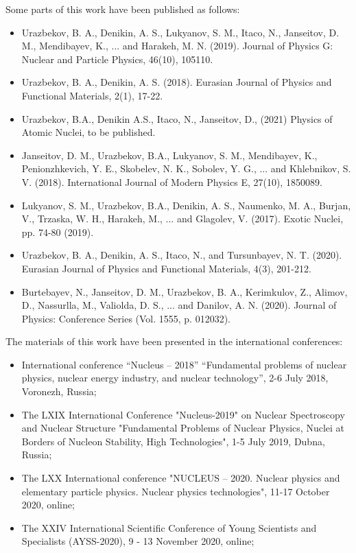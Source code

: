 \documentclass[
12pt, %
oneside, %
english, %
doublespacing, %
doublespacing, %
toctotoc, %
parskip, %
headsepline, %
]{MastersDoctoralThesis} %
\begin{document}
Some parts of this work have been published as follows:
\begin{itemize}
\item	Urazbekov, B. A., Denikin, A. S., Lukyanov, S. M., Itaco, N., Janseitov, D. M., Mendibayev, K., ... and Harakeh, M. N. (2019). Journal of Physics G: Nuclear and Particle Physics, 46(10), 105110.
\item	Urazbekov, B. A.,  Denikin, A. S. (2018).  Eurasian Journal of Physics and Functional Materials, 2(1), 17-22.
\item	Urazbekov, B.A., Denikin A.S., Itaco, N., Janseitov, D., (2021)  Physics of Atomic Nuclei, to be published.
\item	Janseitov, D. M., Urazbekov, B.A., Lukyanov, S. M., Mendibayev, K., Penionzhkevich, Y. E., Skobelev, N. K., Sobolev, Y. G., ... and Khlebnikov, S. V. (2018).  International Journal of Modern Physics E, 27(10), 1850089.
\item	Lukyanov, S. M., Urazbekov, B.A., Denikin, A. S., Naumenko, M. A., Burjan, V., Trzaska, W. H., Harakeh, M., ... and Glagolev, V. (2017). 
 Exotic Nuclei, pp. 74-80 (2019).
\item	Urazbekov, B. A., Denikin, A. S., Itaco, N., and Tursunbayev, N. T. (2020).  Eurasian Journal of Physics and Functional Materials, 4(3), 201-212.
\item	Burtebayev, N., Janseitov, D. M., Urazbekov, B. A., Kerimkulov, Z., Alimov, D., Nassurlla, M., Valiolda, D. S., ... and Danilov, A. N. (2020).  Journal of Physics: Conference Series (Vol. 1555, p. 012032).
\end{itemize}

The materials of this work have been presented in the international conferences:
\begin{itemize}
\item	International conference “Nucleus – 2018” “Fundamental problems of nuclear physics, nuclear energy industry, and nuclear technology”, 2-6 July 2018, Voronezh, Russia;
\item	The LXIX International Conference "Nucleus-2019" on Nuclear Spectroscopy and Nuclear Structure "Fundamental Problems of Nuclear Physics, Nuclei at Borders of Nucleon Stability, High Technologies", 1-5 July 2019, Dubna, Russia;
\item	The LXX International conference "NUCLEUS – 2020. Nuclear physics and elementary particle physics. Nuclear physics technologies", 11-17 October 2020, online;
\item	The XXIV International Scientific Conference of Young Scientists and Specialists (AYSS-2020),  9 - 13 November 2020, online;
\end{itemize} 
\end{document}
